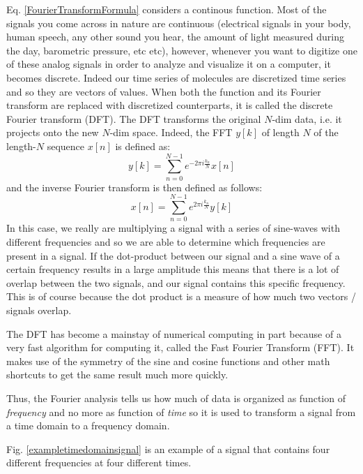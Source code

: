 \documentclass[12pt,a4paper]{report}
\begin{document}
Eq. \ref{FourierTransformFormula} considers a continous function. Most of the signals you come across in nature are continuous (electrical signals in your body, human speech, any other sound you hear, the amount of light measured during the day, barometric pressure, etc etc), however, whenever you want to digitize one of these analog signals in order to analyze and visualize it on a computer, it becomes discrete. Indeed our time series of molecules are discretized time series and so they are vectors of values. When both the function and its Fourier transform are replaced with discretized counterparts, it is called the discrete Fourier transform (DFT). The DFT transforms the original $N$-dim data, i.e. it projects onto the new $N$-dim space. Indeed, the FFT $y[k]$ of length $N$ of the length-$N$ sequence $x[n]$ is defined as:
\begin{equation}
 y[k] = \sum_{n=0}^{N-1} e^{-2\pi i\frac{k_{n}}{N}}x[n] 
\end{equation}
and the inverse Fourier transform is then defined as follows:
\begin{equation}
 x[n] = \sum_{n=0}^{N-1} e^{2\pi i\frac{k_{n}}{N}}y[k] 
\end{equation}
In this case, we really are multiplying a signal with a series of sine-waves with different frequencies  and so we are able to determine which frequencies are present in a signal. If the dot-product between our signal and a sine wave of a certain frequency results in a large amplitude this means that there is a lot of overlap between the two signals, and our signal contains this specific frequency. This is of course because the dot product is a measure of how much two vectors / signals overlap.

The DFT has become a mainstay of numerical computing in part because of a very fast algorithm for computing it, called the Fast Fourier Transform (FFT). It makes use of the symmetry of the sine and cosine functions and other math shortcuts to get the same result much more quickly.

Thus, the Fourier analysis tells us how much of data is organized as function of \emph{frequency} and no more as function of \emph{time} so it is used to transform a signal from a time domain to a frequency domain.

Fig. \ref{exampletimedomainsignal} is an example of a signal that contains four different frequencies at four different times.
\end{document}
